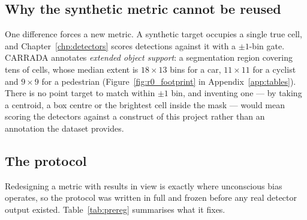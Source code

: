 \subsection{Why the synthetic metric cannot be reused}

One difference forces a new metric. A synthetic target occupies a single true cell, and
Chapter~\ref{chp:detectors} scores detections against it with a $\pm 1$-bin gate. CARRADA annotates
\emph{extended object support}: a segmentation region covering tens of cells, whose median extent is
$18 \times 13$ bins for a car, $11 \times 11$ for a cyclist and $9 \times 9$ for a pedestrian
(Figure~\ref{fig:r0_footprint} in Appendix~\ref{app:tables}). There is no point target to match
within $\pm 1$ bin, and inventing one --- by taking a centroid, a box centre or the brightest cell
inside the mask --- would mean scoring the detectors against a construct of this project rather than
an annotation the dataset provides.

\subsection{The protocol}

Redesigning a metric with results in view is exactly where unconscious bias operates, so the
protocol was written in full and frozen before any real detector output existed.
Table~\ref{tab:prereg} summarises what it fixes.

